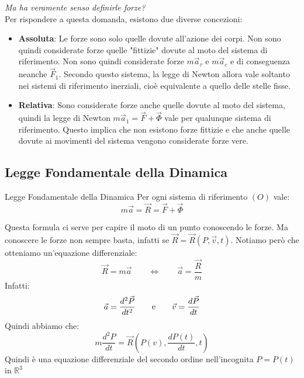 \documentclass[11pt,a4paper,twoside]{article}
\theoremstyle{definition}
\begin{document}
\textit{Ma ha veramente senso definirle forze?}\\
Per rispondere a questa domanda, esistono due diverse concezioni:
\begin{itemize}
	\item \textbf{Assoluta}: Le forze sono solo quelle dovute all'azione dei corpi. Non sono quindi considerate forze quelle "fittizie" dovute al moto del sistema di riferimento. Non sono quindi considerate forze $m\vec a_\tau$ e $m\vec a_c$ e di conseguenza neanche $\vec F_1$. Secondo questo sistema, la legge di Newton allora vale soltanto nei sistemi di riferimento inerziali, cioè equivalente a quello delle stelle fisse.
	\item \textbf{Relativa}: Sono considerate forze anche quelle dovute al moto del sistema, quindi la legge di Newton $m\vec a_1 = \vec F + \vec \Phi$ vale per qualunque sistema di riferimento. Questo implica che non esistono forze fittizie e che anche quelle dovute ai movimenti del sistema vengono considerate forze vere.
\end{itemize}

\subsection{Legge Fondamentale della Dinamica}

\begin{defn}{Legge Fondamentale della Dinamica}{}
	Per ogni sistema di riferimento $(O)$ vale:
	\[ m\vec a = \vec R = \vec F + \vec \Phi \]
\end{defn}

Questa formula ci serve per capire il moto di un punto conoscendo le forze. Ma conoscere le forze non sempre basta, infatti se $\vec R = \vec R(P, \vec v, t)$. Notiamo però che otteniamo un'equazione differenziale:
\[ \vec R = m \vec a \qquad \Leftrightarrow \qquad \vec a = \frac{\vec R}m \]
Infatti:
\[ \vec a = \frac{d^2\vec P}{dt^2} \qquad \text e \qquad \vec v = \frac{d\vec P}{dt} \]
Quindi abbiamo che:
\[ m\frac{d^2 P}{dt} = \vec R\left(P(v), \frac{dP(t)}{dt}, t \right) \]
Quindi è una equazione differenziale del secondo ordine nell'incognita $P = P(t)$ in $\mathbb R^3$
\end{document}
